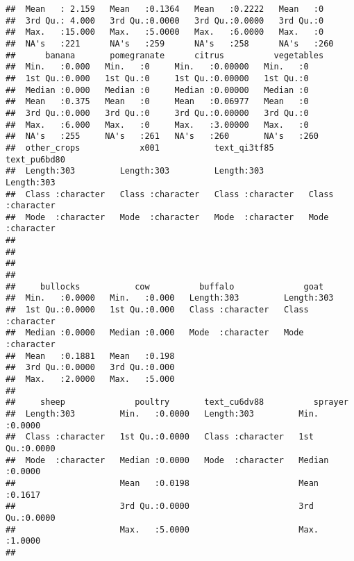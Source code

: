 \documentclass[
]{article}
\begin{document}
\begin{verbatim}
##  Mean   : 2.159   Mean   :0.1364   Mean   :0.2222   Mean   :0    
##  3rd Qu.: 4.000   3rd Qu.:0.0000   3rd Qu.:0.0000   3rd Qu.:0    
##  Max.   :15.000   Max.   :5.0000   Max.   :6.0000   Max.   :0    
##  NA's   :221      NA's   :259      NA's   :258      NA's   :260  
##      banana       pomegranate      citrus          vegetables 
##  Min.   :0.000   Min.   :0     Min.   :0.00000   Min.   :0    
##  1st Qu.:0.000   1st Qu.:0     1st Qu.:0.00000   1st Qu.:0    
##  Median :0.000   Median :0     Median :0.00000   Median :0    
##  Mean   :0.375   Mean   :0     Mean   :0.06977   Mean   :0    
##  3rd Qu.:0.000   3rd Qu.:0     3rd Qu.:0.00000   3rd Qu.:0    
##  Max.   :6.000   Max.   :0     Max.   :3.00000   Max.   :0    
##  NA's   :255     NA's   :261   NA's   :260       NA's   :260  
##  other_crops            x001           text_qi3tf85       text_pu6bd80      
##  Length:303         Length:303         Length:303         Length:303        
##  Class :character   Class :character   Class :character   Class :character  
##  Mode  :character   Mode  :character   Mode  :character   Mode  :character  
##                                                                             
##                                                                             
##                                                                             
##                                                                             
##     bullocks           cow          buffalo              goat          
##  Min.   :0.0000   Min.   :0.000   Length:303         Length:303        
##  1st Qu.:0.0000   1st Qu.:0.000   Class :character   Class :character  
##  Median :0.0000   Median :0.000   Mode  :character   Mode  :character  
##  Mean   :0.1881   Mean   :0.198                                        
##  3rd Qu.:0.0000   3rd Qu.:0.000                                        
##  Max.   :2.0000   Max.   :5.000                                        
##                                                                        
##     sheep              poultry       text_cu6dv88          sprayer      
##  Length:303         Min.   :0.0000   Length:303         Min.   :0.0000  
##  Class :character   1st Qu.:0.0000   Class :character   1st Qu.:0.0000  
##  Mode  :character   Median :0.0000   Mode  :character   Median :0.0000  
##                     Mean   :0.0198                      Mean   :0.1617  
##                     3rd Qu.:0.0000                      3rd Qu.:0.0000  
##                     Max.   :5.0000                      Max.   :1.0000  
##                                                                         

\end{verbatim}
\end{document}
